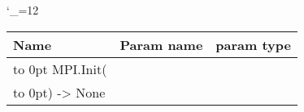 \begingroup \catcode`\_=12 \tt
\begin{tabular}{lll}
\toprule
\textrm{Name}&\textrm{Param name}&\textrm{param type}\\
\midrule
\hbox to 0pt {MPI.Init(\hss}\\
\hbox to 0pt{) -> None\hss}\\
\bottomrule
\end{tabular}
\endgroup
